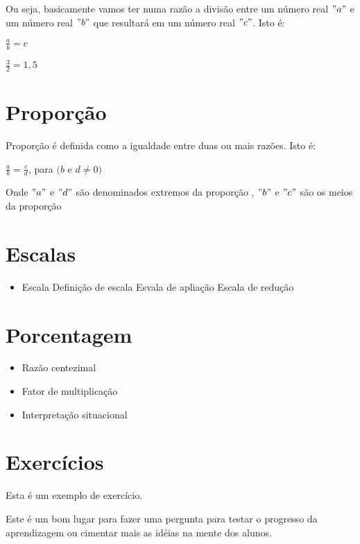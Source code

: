 \documentclass[11pt,fleqn]{book} %
\begin{document}
\noindent Ou seja, basicamente vamos ter numa razão a divisão entre um número real $"a"$ e um número real $"b"$ que resultará em um número real $"c"$. Isto é:  

\begin{center}
	$\frac{a}{b} = c$ 
\end{center}

\begin{example}
   $\frac{3}{2} = 1,5$
\end{example}

\section{Proporção}

Proporção é definida como a igualdade entre duas ou mais razões. Isto é:

\begin{center}
    $\frac{a}{b} = \frac{c}{d}$, para $(b$ e $d \neq 0)$
\end{center}

Onde $"a"$ e $"d"$ são denominados extremos da proporção , $"b"$ e $"c"$ são os meios da proporção

\section{Escalas}

\begin{itemize}
	\item Escala
	\subitem Definição de escala 
	\subitem Esvala de apliação
	\subitem Escala de redução
\end{itemize}

\section{Porcentagem}
\begin{itemize}
	\item Razão centezimal
	\item Fator de multiplicação
	\item Interpretação situacional
\end{itemize}

\section{Exercícios}

Esta é um exemplo de exercício.

\begin{exercise}
Este é um bom lugar para fazer uma pergunta para testar o progresso da aprendizagem ou cimentar mais as idéias na mente dos alunos.
\end{exercise}
\end{document}
